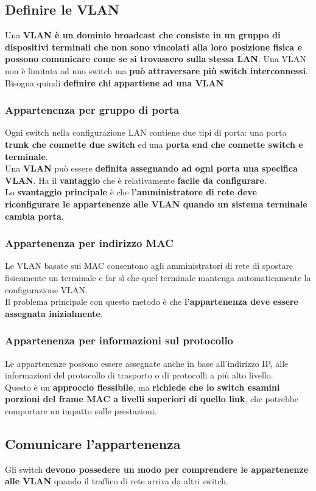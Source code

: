 \documentclass[10pt]{article}
\begin{document}
\subsection{Definire le VLAN}
Una \textbf{VLAN è un dominio broadcast che consiste in un gruppo di dispositivi terminali che non sono vincolati alla loro posizione fisica e possono comunicare come se si trovassero sulla stessa LAN}. Una VLAN non è limitata ad uno switch ma \textbf{può attraversare più switch interconnessi}. Bisogna quindi \textbf{definire chi appartiene ad una VLAN}
\subsubsection{Appartenenza per gruppo di porta}
Ogni switch nella configurazione LAN contiene due tipi di porta: una porta \textbf{trunk che connette due switch} ed una \textbf{porta end che connette switch e terminale}.\\
Una \textbf{VLAN} può essere \textbf{definita assegnando ad ogni porta una specifica VLAN}. Ha il \textbf{vantaggio} che è relativamente \textbf{facile da configurare}.\\
Lo \textbf{svantaggio principale} è che \textbf{l'amministratore di rete deve riconfigurare le appartenenze alle VLAN quando un sistema terminale cambia porta}.
\subsubsection{Appartenenza per indirizzo MAC}
Le VLAN basate sui MAC consentono agli amministratori di rete di spostare fisicamente un terminale e far sì che quel terminale mantenga automaticamente la configurazione VLAN.\\
Il problema principale con questo metodo è che \textbf{l'appartenenza deve essere assegnata inizialmente}.
\subsubsection{Appartenenza per informazioni sul protocollo}
Le appartenenze possono essere assegnate anche in base all'indirizzo IP, alle informazioni del protocollo di trasporto o di protocolli a più alto livello.\\
Questo è un \textbf{approccio flessibile}, ma \textbf{richiede che lo switch esamini porzioni del frame MAC a livelli superiori di quello link}, che potrebbe comportare un impatto sulle prestazioni.
\pagebreak
\subsection{Comunicare l'appartenenza}
Gli switch \textbf{devono possedere un modo per comprendere le appartenenze alle VLAN} quando il traffico di rete arriva da altri switch.
\end{document}
